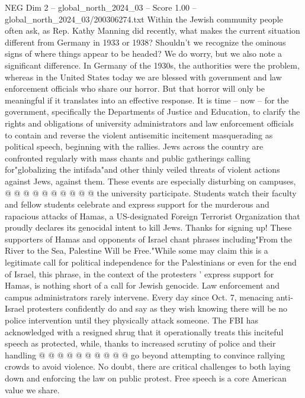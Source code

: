\begin{textsample}{NEG Dim 2 – global\_north\_2024\_03 – Score 1.00 – global\_north\_2024\_03/200306274.txt}  \label{ex:f2_neg_344}
Within the Jewish community people often ask, as Rep.
Kathy Manning did recently, what makes the current situation different from Germany in 1933 or 1938?
Shouldn't we recognize the ominous signs of where things appear to be headed?
We do worry, but we also note a significant difference.
In Germany of the 1930s, the authorities were the problem, whereas in the United States today we are blessed with government and law enforcement officials who share our horror.
But that horror will only be meaningful if it translates into an effective response.
It is time -- now -- for the government, specifically the Departments of Justice and Education, to clarify the rights and obligations of university administrators and law enforcement officials to contain and reverse the violent antisemitic incitement masquerading as political speech, beginning with the rallies.
Jews across the country are confronted regularly with mass chants and public gatherings calling for"globalizing the intifada"and other thinly veiled threats of violent actions against Jews, against them.
These events are especially disturbing on campuses, @ @ @ @ @ @ @ @ @ @ the university participate.
Students watch their faculty and fellow students celebrate and express support for the murderous and rapacious attacks of Hamas, a US-designated Foreign Terrorist Organization that proudly declares its genocidal intent to kill Jews.
Thanks for signing up!
These supporters of Hamas and opponents of Israel chant phrases including"From the River to the Sea, Palestine Will be Free."While some may claim this is a legitimate call for political independence for the Palestinians or even for the end of Israel, this phrase, in the context of the protesters ' express support for Hamas, is nothing short of a call for Jewish genocide.
Law enforcement and campus administrators rarely intervene.
Every day since Oct. 7, menacing anti-Israel protesters confidently do and say as they wish knowing there will be no police intervention until they physically attack someone.
The FBI has acknowledged with a resigned shrug that it operationally treats this inciteful speech as protected, while, thanks to increased scrutiny of police and their handling @ @ @ @ @ @ @ @ @ @ go beyond attempting to convince rallying crowds to avoid violence.
No doubt, there are critical challenges to both laying down and enforcing the law on public protest.
Free speech is a core American value we share.

\end{textsample}
